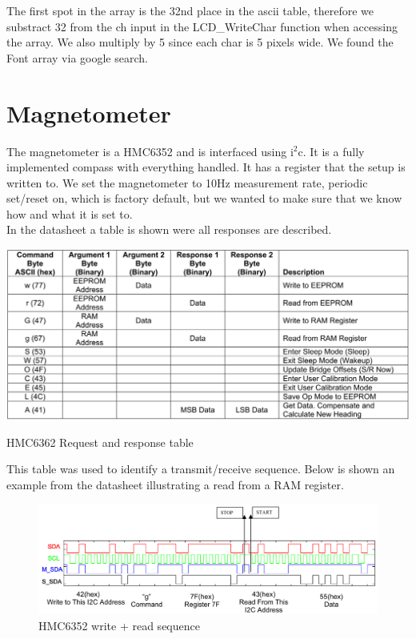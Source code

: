 The first spot in the array is the 32nd place in the ascii table, therefore we substract 32 from the ch input in the LCD\_WriteChar function when accessing the array. We also multiply by 5 since each char is 5 pixels wide. We found the Font array via google search.

\section{Magnetometer}
The magnetometer is a HMC6352 and is interfaced using i$^2$c. It is a fully implemented compass with everything handled. It has a register that  the setup is written to. We set the magnetometer to 10Hz measurement rate, periodic set/reset on, which is factory default, but we wanted to make sure that we know how and what it is set to.\\
In the datasheet a table is shown were all responses are described.

\begin{table}[H]
\centering
\includegraphics[width=.9\textwidth]{billeder/HMC6352_responses}
\caption{HMC6362 Request and response table}
\end{table}

This table was used to identify a transmit/receive sequence. Below is shown an example from the datasheet illustrating a read from a RAM register.

\begin{figure}[H]
\centering
\includegraphics[width=.8\textwidth]{billeder/HMC6352_example}
\caption{HMC6352 write + read sequence}
\end{figure}

